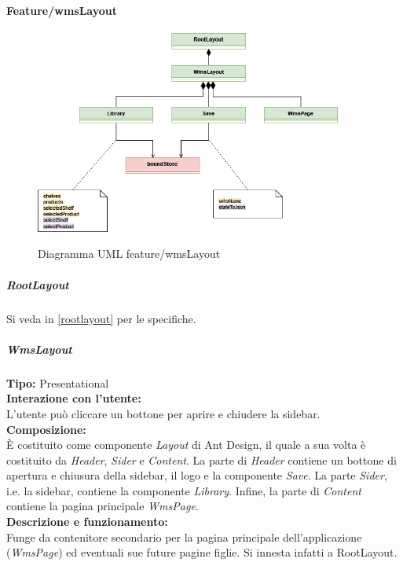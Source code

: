 \paragraph{Feature/wmsLayout}
\begin{figure}[H]
    \centering
    \includegraphics[width=0.9\textwidth]{images/UML/feature_wmsLayout.drawio.png}
    \label{fig:UML_feature_wmsLayout}
    \caption{Diagramma UML feature/wmsLayout}
\end{figure}

\subparagraph{\colorbox{verde_uml}{RootLayout}}
Si veda in \ref{rootlayout} per le specifiche.

\subparagraph{\colorbox{verde_uml}{WmsLayout}}
\textbf{Tipo:} Presentational \\
\textbf{Interazione con l'utente:} \\
L'utente può cliccare un bottone per aprire e chiudere la sidebar. \\
\textbf{Composizione:} \\
È costituito come componente \textit{Layout} di Ant Design, il quale a sua volta è costituito da \textit{Header}, \textit{Sider} e \textit{Content}.  La parte di \textit{Header} contiene un bottone di apertura e chiusura della sidebar, il logo e la componente \textit{Save}. La parte \textit{Sider}, i.e. la sidebar, contiene la componente \textit{Library}. Infine, la parte di \textit{Content} contiene la pagina principale \textit{WmsPage}.  \\
\textbf{Descrizione e funzionamento:} \\
Funge da contenitore secondario per la pagina principale dell'applicazione (\textit{WmsPage}) ed eventuali sue future pagine figlie. Si innesta infatti a RootLayout. 

